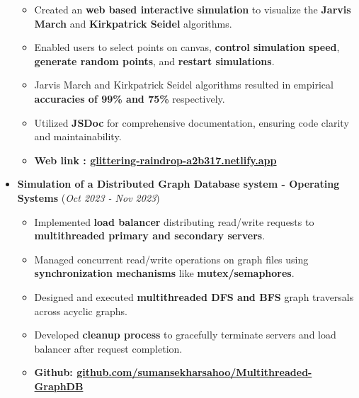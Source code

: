 \documentclass[10pt]{extarticle}
\begin{document}
\begin{itemize}
\begin{itemize}
\item Created an \textbf{web based interactive simulation} to visualize the \textbf{Jarvis March} and \textbf{Kirkpatrick Seidel} algorithms.
\item Enabled users to select points on canvas, \textbf{control simulation speed}, \textbf{generate random points}, and \textbf{restart simulations}.
\item Jarvis March and Kirkpatrick Seidel algorithms resulted in empirical \textbf{accuracies of 99\% and 75\% }respectively.
\item Utilized \textbf{JSDoc} for comprehensive documentation, ensuring code clarity and maintainability.
\item \textbf{Web link : \href{https://glittering-raindrop-a2b317.netlify.app/}{glittering-raindrop-a2b317.netlify.app}}
\end{itemize}
\vspace{2mm}
\item \textbf{Simulation of a Distributed Graph Database system - Operating Systems} \hfill\hfill(\textit{Oct 2023 - Nov 2023})\
\begin{itemize}
\item Implemented \textbf{load balancer} distributing read/write requests to \textbf{multithreaded primary and secondary servers}.
\item Managed concurrent read/write operations on graph files using \textbf{synchronization mechanisms} like \textbf{mutex/semaphores}.
\item Designed and executed \textbf{multithreaded DFS and BFS} graph traversals across acyclic graphs.
\item Developed \textbf{cleanup process} to gracefully terminate servers and load balancer after request completion.
\item \textbf{Github: \href{https://github.com/sumansekharsahoo/Multithreaded-GraphDB}{github.com/sumansekharsahoo/Multithreaded-GraphDB}}
\end{itemize}
\end{itemize}
\vspace{-5mm}
\end{document}
